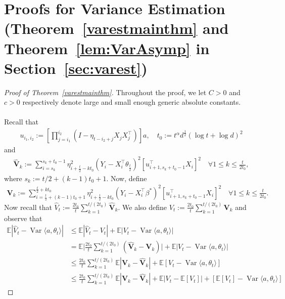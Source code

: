 \documentclass[11pt, reqno,english]{amsart}
\DeclareMathOperator{\Var}{Var} \DeclareMathOperator{\N}{N}
\begin{document}
\section{Proofs for Variance Estimation (Theorem~\ref{varestmainthm} and Theorem~\ref{lem:VarAsymp} in Section~\ref{sec:varest})}\label{varestproof}
\begin{proof}[Proof of Theorem~\ref{varestmainthm}]
Throughout the proof, we let $C  > 0$ and $c > 0$ respectively denote large and small enough generic absolute constants.
\\\\
Recall that 
\begin{align*}
u_{i_1,i_2} := [\prod_{j = i_1}^{i_2}(I - \eta_{t-i_2 + j}X_{j}X^\top_{j})]a, \quad t_0 := t^{\alpha}d^{\frac{1}{2}}(\log t + \log d)^2    
\end{align*}
and
\begin{align*}
    \hat{\mathbf{V}}_{k} := \sum_{i = s_k}^{s_k + t_0 - 1}  \eta^2_{i + \frac{t}{2} - kt_0} (Y_i - X^\top_i \theta_{\frac{t}{2}})^2 [u^\top_{i+1, s_k + t_0 - 1}X_i]^2 \quad \forall 1 \leq k \leq \frac{t}{2t_0}, 
\end{align*}
where $s_k := t/2 + (k-1)t_0 + 1$. Now, define
\begin{align*}
    \mathbf{V}_k := \sum_{i = \frac{t}{2} + (k-1)t_0 + 1}^{\frac{t}{2} + kt_0}  \eta^2_{i + \frac{t}{2} - kt_0} (Y_i - X^\top_i \beta^*)^2 [u^\top_{i+1, s_k + t_0 - 1}X_i]^2 \quad \forall 1 \leq k \leq \frac{t}{2t_0}.
\end{align*}
Now recall that $\hat{V}_t := \frac{2t_0}{t}\sum_{k = 1}^{t/(2t_0)}\hat{\mathbf{V}}_k$. We also define $V_t := \frac{2t_0}{t}\sum_{k = 1}^{t/(2t_0)}{\mathbf{V}}_k$ and observe that
\begin{align*}
    \mathbb{E}|\hat{V}_t - \Var \langle a, \theta_t \rangle| &\leq \mathbb{E}|\hat{V}_t - V_t| + \mathbb{E}|V_t - \Var \langle a, \theta_t \rangle|
    \\
    &= \mathbb{E}\bigg|\frac{2t_0}{t}\sum_{k = 1}^{t/(2t_0)}(\hat{\mathbf{V}}_k - \mathbf{V}_k)\bigg| + \mathbb{E}|V_t - \Var \langle a, \theta_t \rangle|
    \\
    &\leq \frac{2t_0}{t}\sum_{k = 1}^{t/(2t_0)}\mathbb{E}|\mathbf{V}_k - \hat{\mathbf{V}}_k| + \mathbb{E}[V_t - \Var \langle a, \theta_t \rangle]
    \\
    &\leq \frac{2t_0}{t}\sum_{k = 1}^{t/(2t_0)}\mathbb{E}|\mathbf{V}_k - \hat{\mathbf{V}}_k|  + \mathbb{E}|V_t - \mathbb{E}[V_t]| + [\mathbb{E}[V_t] - \Var \langle a, \theta_t \rangle]
\end{align*}

\end{proof}
\end{document}
